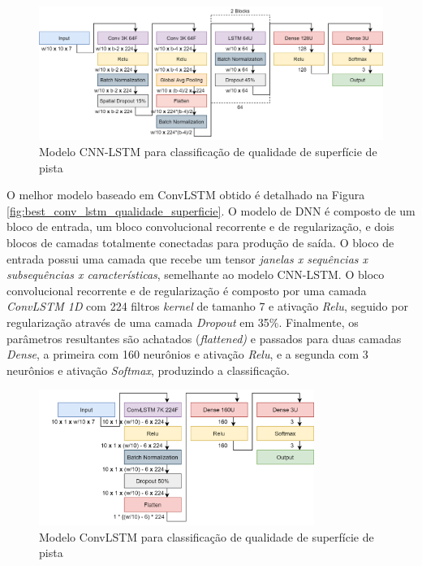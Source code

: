 \begin{figure}[h!]
  \centering
  \caption{Modelo CNN-LSTM para classificação de qualidade de superfície de pista}
  \label{fig:best_cnn_lstm_qualidade_superficie}
  \includegraphics[width=1\textwidth]{figuras/fig_49.png}
\end{figure}

O melhor modelo baseado em ConvLSTM obtido é detalhado na Figura \autoref{fig:best_conv_lstm_qualidade_superficie}. O modelo de DNN é composto de um bloco de entrada, um bloco convolucional recorrente e de regularização, e dois blocos de camadas totalmente conectadas para produção de saída. O bloco de entrada possui uma camada que recebe um tensor \emph{janelas x sequências x subsequências x características}, semelhante ao modelo CNN-LSTM. O bloco convolucional recorrente e de regularização é composto por uma camada \textit{ConvLSTM 1D} com 224 filtros \textit{kernel} de tamanho 7 e ativação \textit{Relu}, seguido por regularização através de uma camada \textit{Dropout} em 35\%. Finalmente, os parâmetros resultantes são achatados (\textit{flattened)} e passados para duas camadas \textit{Dense}, a primeira com 160 neurônios e ativação \textit{Relu}, e a segunda com 3 neurônios e ativação \textit{Softmax}, produzindo a classificação.

\begin{figure}[ht!]
  \centering
  \caption{Modelo ConvLSTM para classificação de qualidade de superfície de pista}
  \label{fig:best_conv_lstm_qualidade_superficie}
  \includegraphics[width=0.8\textwidth]{figuras/fig_50.png}
\end{figure}

